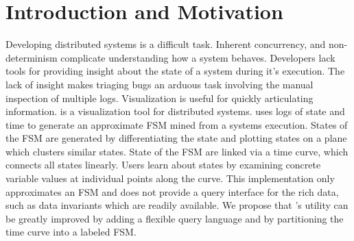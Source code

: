 \section{Introduction and Motivation}
\label{sec:intro}

Developing distributed systems is a difficult task. Inherent
concurrency, and non-determinism complicate understanding how a system
behaves. Developers lack tools for providing insight about the state
of a system during it's execution.  The lack of insight makes triaging
bugs an arduous task involving the manual inspection of multiple logs.
Visualization is useful for quickly articulating information.  \dviz
is a visualization tool for distributed systems. \dviz uses logs of
state and time to generate an approximate FSM mined from a systems
execution. States of the FSM are generated by differentiating the
state and plotting states on a plane which clusters similar states.
State of the FSM are linked via a time curve, which connects all
states linearly. Users learn about states by examining concrete
variable values at individual points along the curve. This
implementation only approximates an FSM and does not provide a query
interface for the rich data, such as data invariants which are readily
available. We propose that \dviz's utility can be greatly improved by
adding a flexible query language and by partitioning the time curve
into a labeled FSM.
